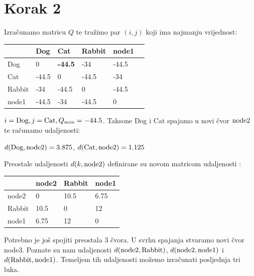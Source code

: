 \documentclass[times, utf8, seminar, numeric]{fer}
\begin{document}
\newpage
\section{Korak 2}
Izračunamo matricu $Q$ te tražimo par $(i,j)$ koji ima najmanju vrijednost:

\begin{table}[h]
	\centering
    \begin{tabular}{|l|l|l|l|l|l|}
    \hline
~     & Dog     & Cat     & Rabbit     & node1 \\ \hline
    Dog     & 0     & \textbf{-44.5} & -34   & -44.5 \\ \hline
    Cat     & -44.5 & 0     & -44.5 & -34   \\ \hline
    Rabbit     & -34   & -44.5 & 0     & -44.5 \\ \hline
    node1 & -44.5 & -34   & -44.5 & 0     \\ \hline
    \end{tabular}
\end{table}

$i = \textup{Dog}, j = \textup{Cat}, Q_{min} = -44.5$. Taksone Dog i Cat spajamo u novi čvor $\textup{node2}$ te računamo udaljenosti: 

\indent $d(\textup{Dog},\textup{node2}) = 3.875$, \newline
\indent $d(\textup{Cat},\textup{node2}) = 1.125$ \newline


Preostale udaljenosti $d(k,\textup{node2})$ definirane su novom matricom udaljenosti :

\begin{table}[h]
	\centering
    \begin{tabular}{|l|l|l|l|}
    \hline
    ~     & node2 & Rabbit    & node1 \\ \hline
    node2 & 0     & 10.5 & 6.75  \\ \hline
    Rabbit     & 10.5  & 0    & 12    \\ \hline
    node1 & 6.75  & 12   & 0     \\ \hline
    \end{tabular}
\end{table}

Potrebno je još spojiti preostala $3$ čvora. U svrhu spajanja stvaramo novi čvor node3. Poznate su nam udaljenosti $d(\textup{node2},\textup{Rabbit})$, $d(\textup{node2}, \textup{node1})$ i  $d(\textup{Rabbit},\textup{node1})$. Temeljem tih udaljenosti možemo izračunati posljednja tri luka. \newline
\end{document}
